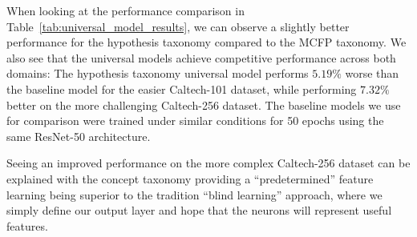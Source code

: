 When looking at the performance comparison in Table~\ref{tab:universal_model_results},
we can observe a slightly better performance for the hypothesis taxonomy compared to the MCFP taxonomy.
We also see that the universal models achieve competitive performance across both domains:
The hypothesis taxonomy universal model performs $5.19\%$ worse than the baseline model
for the easier Caltech-101 dataset, while performing $7.32\%$ better on the more challenging Caltech-256 dataset.
The baseline models we use for comparison were trained under similar conditions for 50 epochs
using the same ResNet-50 architecture.

Seeing an improved performance on the more complex Caltech-256 dataset can be explained with
the concept taxonomy providing a \enquote{predetermined} feature learning being superior
to the tradition \enquote{blind learning} approach, where we simply define our output layer
and hope that the neurons will represent useful features.



